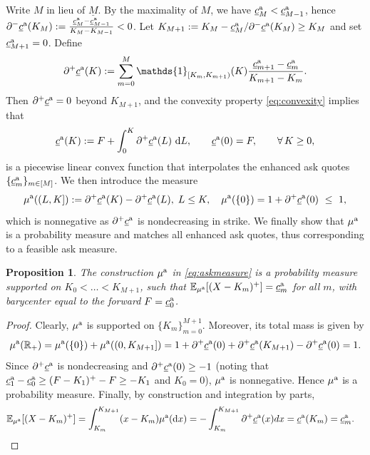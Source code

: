\documentclass[11pt]{article}
\newcommand{\R}{\mathbb{R}} %
\theoremstyle{plain}
\newtheorem{proposition}[theorem]{Proposition}
\theoremstyle{definition}
\theoremstyle{remark}
\newcommand{\E}{\mathbb{E}}
\newcommand*{\rd}{\mathrm{d}}
\newcommand*{\dd}{\, \rd}
\theoremstyle{plain}
\begin{document}
Write $M$ in lieu of $\underline{M}$. By the maximality of $M$, we have $\underline{c}_{M}^{\rm a} < \underline{c}_{M-1}^{\rm a}$,  hence
$\partial^-\underline{c}^{\rm a}(K_M)
:= \frac{\underline{c}_{M}^{\rm a}-\underline{c}_{M-1}^{\rm a}}{K_M-K_{M-1}} < 0$. Let
$K_{M+1}:=K_M-\underline{c}_M^{\rm a}/\partial^-\underline{c}^{\rm a}(K_M)\ge K_M$ and set $\underline{c}_{M+1}^{\rm a}=0$. Define %
\begin{equation*}
\partial^+\underline{c}^{\rm a}(K)
:= \sum_{m=0}^{M} \mathds{1}_{[K_m,K_{m+1})}(K)
\frac{\underline{c}_{m+1}^{\rm a}-\underline{c}_{m}^{\rm a}}{K_{m+1}-K_m}.
\end{equation*}
Then $\partial^+\underline{c}^{\rm a} = 0$ beyond $K_{M+1}$, and  the convexity property \eqref{eq:convexity} implies that
\[
\underline{c}^{\rm a}(K)
:= F + \int_{0}^K \partial^+\underline{c}^{\rm a}(L)\,\dd L,
\qquad \underline{c}^{\rm a}(0)=F,
\qquad \forall\, K\ge 0,
\]
is a piecewise linear convex function that interpolates the enhanced ask quotes
$\{\underline{c}_m^{\rm a}\}_{m\in[M]}$. We then introduce the measure
\begin{equation}\label{eq:askmeasure}
    \mu^{\rm a}((L,K]) := \partial^+\underline{c}^{\rm a}(K) -\partial^+\underline{c}^{\rm a}(L), \;   L\le K,\quad    \mu^{\rm a}(\{0\}) = 1 + \partial^+\underline{c}^{\rm a}(0) \  \le  \ 1,
\end{equation}
which is nonnegative as $\partial^+\underline{c}^{\rm a}$ is nondecreasing in strike. We finally show that $\mu^{\rm a}$ is a probability measure and matches all enhanced ask quotes, thus corresponding to a feasible ask measure. 


\begin{proposition}
%

The construction $\mu^{\rm a}$ in \eqref{eq:askmeasure} is a probability measure supported on $K_0<\ldots  < K_{M+1}$, such that      $\E_{\mu^{\rm a}}[(X-K_m)^+] = \underline{c}^{\rm a}_{m}$ for all $m$, with barycenter equal to  the forward $F = \underline{c}^{\rm a}_{0}$.  
\end{proposition}

\begin{proof}

Clearly,  $\mu^{\rm a}$ is  supported on $\{K_m\}_{m=0}^{M+1}$. Moreover,  its  total mass is given by 
$$\mu^{\rm a}(\R_+)= \mu^{\rm a}(\{0\}) + \mu^{\rm a}((0,K_{M+1}]) = 1 + \partial^+\underline{c}^{\rm a}(0) + \partial^+\underline{c}^{\rm a}(K_{M+1}) - \partial^+\underline{c}^{\rm a}(0) = 1.$$
Since  $\partial^+\underline{c}^{\rm a}$ is nondecreasing and $\partial^+\underline{c}^{\rm a}(0) \ge -1$ (noting that $\underline{c}^{\rm a}_1 -\underline{c}^{\rm a}_0 \ge (F-K_1)^+ -F \ge -K_1$ and $K_0 =0$),  $\mu^{\rm a}$ is nonnegative. Hence $\mu^{\rm a}$ is a probability measure. 
Finally,  by construction and integration by parts, 
\begin{align*}
    \E_{\mu^{\rm a}}[(X-K_m)^+] &= \int_{K_m}^{K_{M+1}} (x-K_m) \mu^{\rm a}(\rd x)  =  -\int_{K_m}^{K_{M+1}}\partial^+\underline{c}^{\rm a}(x)dx = \underline{c}^{\rm a}(K_m)=  \underline{c}^{\rm a}_{m}.
\end{align*}
    
\end{proof}
\end{document}
